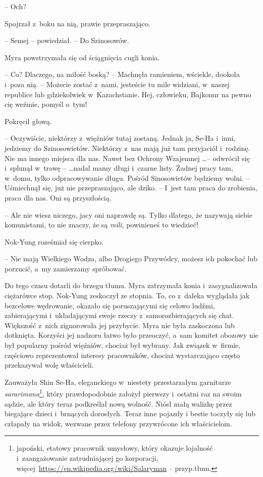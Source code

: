 \documentclass[oneside,polish,11pt,sfheadings]{mwbk}
\begin{document}
-- Och?

Spojrzał z~boku na nią, prawie przepraszająco. 

-- Semej -- powiedział. -- Do Szinosowów.

Myra powstrzymała się od ściągnięcia cugli konia. 

-- Co? Dlaczego, na
miłość boską? -- Machnęła ramieniem, wściekle, dookoła i~poza nią. -- Możecie zostać z~nami, jesteście tu mile widziani, w~naszej republice
lub gdziekolwiek w~Kazachstanie. Hej, człowieku, Bajkonur na pewno cię
weźmie, pomyśl o~tym!

Pokręcił głową. 

-- Oczywiście, niektórzy z~więźniów tutaj zostaną. Jednak
ja, Se-Ha i~inni, jedziemy do Szinosowietów. Niektórzy z~nas mają już
tam przyjaciół i~rodzinę. Nie ma innego miejsca dla nas. Nawet bez
Ochrony Wzajemnej \ldots -- odwrócił się i~splunął w~trawę -- \ldots nadal mamy
długi i~czarne listy. Żadnej pracy tam, w~domu, tylko odpracowywanie
długu. Pośród Sinosowietów będziemy wolni. -- Uśmiechnął się, już nie
przepraszająco, ale dziko. -- I~jest tam praca do zrobienia, praca dla
nas. Oni są przyszłością.

-- Ale nie wiesz niczego, jacy oni naprawdę są. Tylko dlatego, że
nazywają siebie komunistami, to nie znaczy, że są \textit{mili},
powinieneś to wiedzieć!

Nok-Yung roześmiał się cierpko. 

-- Nie mają Wielkiego Wodza, albo
Drogiego Przywódcy, możesz ich pokochać lub porzucić, a~my zamierzamy
spróbować.

Do tego czasu dotarli do brzegu tłumu. Myra zatrzymała konia i~zasygnalizowała ciężarówce stop. Nok-Yung zeskoczył ze stopnia. To, co z~daleka wyglądała jak bezcelowe wędrowanie, okazało się poruszającymi się
celowo ludźmi, zabierającymi i~układającymi swoje rzeczy z~samorozbierających się chat. Większość z~nich zignorowała jej przybycie.
Myra nie była zaskoczona lub dotknięta. Korzyści jej nadzoru łatwo było
przeoczyć, a~sam komitet obozowy nie był popularny pośród więźniów,
chociaż był wybrany. Jak związek w~firmie, częściowo reprezentował
interesy pracowników, chociaż wystarczająco często przekazywał wolę
właścicieli.

Zauważyła Shin Se-Ha, eleganckiego w~niestety przestarzałym garniturze
\textit{sararimana}\footnote{ japoński, etatowy pracownik umysłowy, który
okazuje lojalność i~zaangażowanie zatrudniającej go korporacji,
więcej~\url{https://en.wikipedia.org/wiki/Salaryman} -- przyp.tłum.}, który prawdopodobnie założył pierwszy i~ostatni raz na
swoim sądzie, ale który teraz podkreślał nową wolność. Niósł małą
walizkę przez biegające dzieci i~brnących dorosłych. Teraz inne pojazdy
i bestie toczyły się lub człapały na widok, wezwane przez telefony
przywrócone ich właścicielom.
\end{document}
